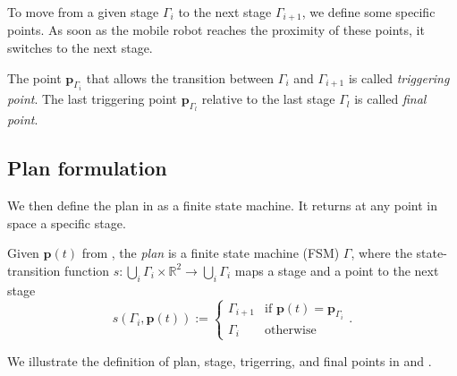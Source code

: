 To move from a given stage $\Gamma_i$ to the next stage $\Gamma_{i+1}$, we define some specific points. As soon as the mobile robot reaches the proximity of these points, it switches to the next stage.

\begin{highlight}  
  \begin{defn}\label{def:trigs}
    The point $\mathbf{p}_{\Gamma_{i}}$ that allows the transition between $\Gamma_i$ and $\Gamma_{i+1}$ is called \emph{triggering point}. The last triggering point $\mathbf{p}_{\Gamma_{l}}$ relative to the last stage $\Gamma_l$ is called \emph{final point}.
  \end{defn}
\end{highlight}

\subsection{Plan formulation}

We then define the plan in  as a finite state machine. It returns at any point in space a specific stage.

\begin{highlight}  
  \begin{defn}[Plan]\label{def:plan}
    Given $\mathbf{p}(t)$ from , the \emph{plan} is a finite state machine (FSM) $\Gamma$, where the state-transition function $s:\bigcup_i{\Gamma_i}\times\mathbb{R}^2\rightarrow\bigcup_i{\Gamma_i}$ maps a stage and a point to the next stage
    \begin{equation*}s(\Gamma_i,\mathbf{p}(t)):=\begin{cases}
      \Gamma_{i+1} & \text{if }\mathbf{p}(t)=\mathbf{p}_{\Gamma_i}\\
      \Gamma_i & \text{otherwise}
    \end{cases}.\end{equation*}
  \end{defn}
\end{highlight}

We illustrate the definition of plan, stage, trigerring, and final points in  and .

